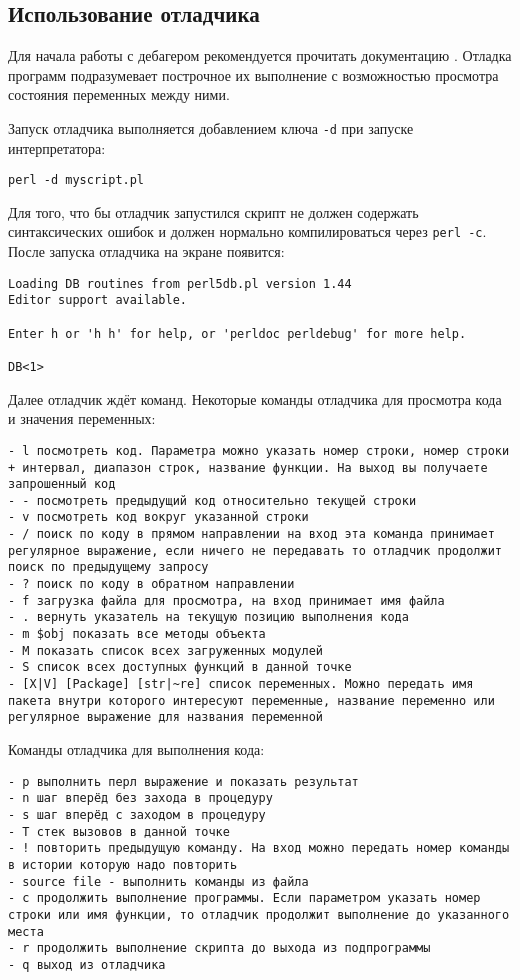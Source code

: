 \subsection{Использование отладчика}
Для начала работы с дебагером рекомендуется прочитать документацию . Отладка программ подразумевает построчное их выполнение с возможностью просмотра состояния переменных между ними.

Запуск отладчика выполняется добавлением ключа \verb|-d| при запуске интерпретатора:
\begin{verbatim}
perl -d myscript.pl
\end{verbatim}
Для того, что бы отладчик запустился скрипт не должен содержать синтаксических ошибок и должен нормально компилироваться через \verb|perl -c|. После запуска отладчика на экране появится:
\begin{verbatim}
Loading DB routines from perl5db.pl version 1.44
Editor support available.

Enter h or 'h h' for help, or 'perldoc perldebug' for more help.

DB<1>
\end{verbatim}
Далее отладчик ждёт команд. Некоторые команды отладчика для просмотра кода и значения переменных:
\begin{verbatim}
- l посмотреть код. Параметра можно указать номер строки, номер строки + интервал, диапазон строк, название функции. На выход вы получаете запрошенный код
- - посмотреть предыдущий код относительно текущей строки
- v посмотреть код вокруг указанной строки
- / поиск по коду в прямом направлении на вход эта команда принимает регулярное выражение, если ничего не передавать то отладчик продолжит поиск по предыдущему запросу
- ? поиск по коду в обратном направлении
- f загрузка файла для просмотра, на вход принимает имя файла
- . вернуть указатель на текущую позицию выполнения кода
- m $obj показать все методы объекта
- M показать список всех загруженных модулей
- S список всех доступных функций в данной точке
- [X|V] [Package] [str|~re] список переменных. Можно передать имя пакета внутри которого интересуют переменные, название переменно или регулярное выражение для названия переменной
\end{verbatim}
Команды отладчика для выполнения кода:
\begin{verbatim}
- p выполнить перл выражение и показать результат
- n шаг вперёд без захода в процедуру
- s шаг вперёд с заходом в процедуру
- T стек вызовов в данной точке
- ! повторить предыдущую команду. На вход можно передать номер команды в истории которую надо повторить
- source file - выполнить команды из файла
- с продолжить выполнение программы. Если параметром указать номер строки или имя функции, то отладчик продолжит выполнение до указанного места
- r продолжить выполнение скрипта до выхода из подпрограммы
- q выход из отладчика
\end{verbatim}
